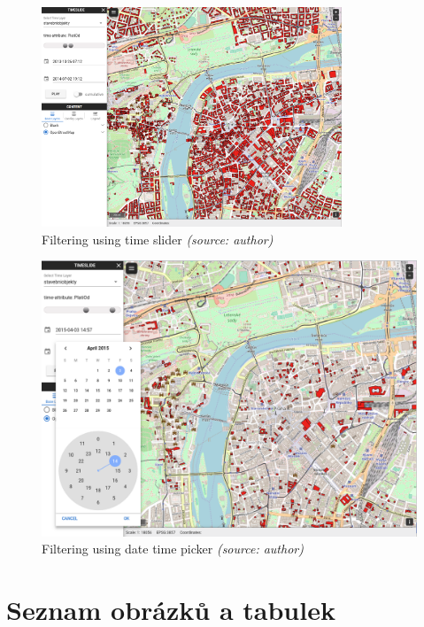 \begin{figure}[h!]
	\centering
	\includegraphics[width=0.8\textwidth]{./img/prague-filter.png}
	\caption{Filtering using time slider \textit{(source: author)}}
	\label{fig:prague-filter}
\end{figure}

\newpage
\begin{figure}[h!]
	\centering
	\includegraphics[width=1\textwidth]{./img/prague-picker.png}
	\caption{Filtering using date time picker \textit{(source: author)}}
	\label{fig:prague-picker}
\end{figure}

\newpage
\section{Seznam obrázků a tabulek}
\listoffigures
\listoftables


